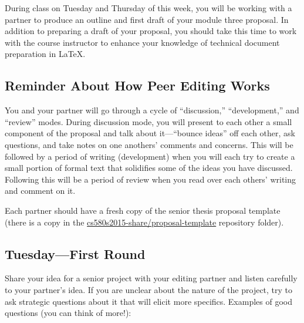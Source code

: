 

\usepackage[compact]{titlesec}




During class on Tuesday and Thursday of this week, you will be working with a partner to produce an outline and first
draft of your module three proposal. In addition to preparing a draft of your proposal, you should take this time to
work with the course instructor to enhance your knowledge of technical document preparation in \LaTeX.

\subsection*{Reminder About How Peer Editing Works}

You and your partner will go through a cycle of ``discussion,'' ``development,'' and ``review''  modes.  During
discussion mode, you will present to each other a small component of the proposal and talk about it---``bounce ideas''
off each other, ask questions, and take notes on one anothers' comments and concerns.  This will be followed by a period
of writing (development) when you will each try to create a small portion of formal text that solidifies some of the
ideas you have discussed.  Following this will be a period of review when you read over each others' writing and comment
on it.

Each partner should have a fresh copy of the senior thesis proposal template
(there is a copy in the \url{cs580s2015-share/proposal-template} repository
folder).

\subsection*{Tuesday---First Round}

 Share your idea for a senior project with your editing
partner and listen carefully to your partner's idea. If you are unclear about
the nature of the project, try to ask strategic questions about it that will
elicit more specifics. Examples of good questions (you can think of more!):

